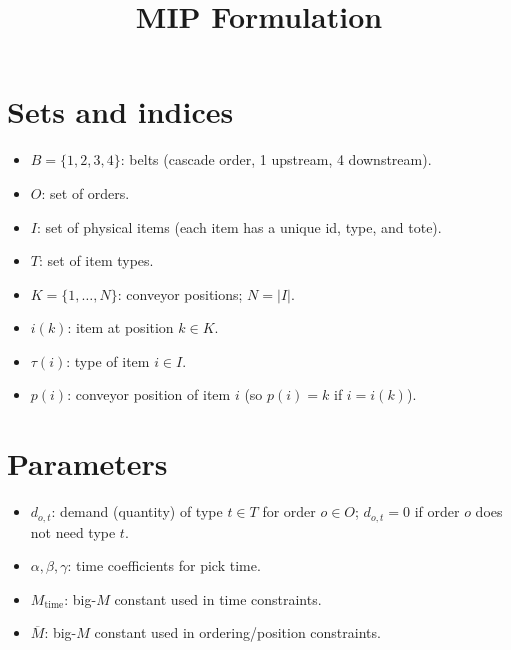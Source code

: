 \documentclass[11pt]{article}
\title{MIP Formulation}
\author{}
\date{}
\begin{document}
\maketitle

\section{Sets and indices}
\begin{itemize}
  \item $B = \{1,2,3,4\}$: belts (cascade order, 1 upstream, 4 downstream).
  \item $O$: set of orders.
  \item $I$: set of physical items (each item has a unique id, type, and tote).
  \item $T$: set of item types.
  \item $K = \{1,\ldots,N\}$: conveyor positions; $N = |I|$.
  \item $i(k)$: item at position $k \in K$.
  \item $\tau(i)$: type of item $i \in I$.
  \item $p(i)$: conveyor position of item $i$ (so $p(i) = k$ if $i = i(k)$).
\end{itemize}

\section{Parameters}
\begin{itemize}
  \item $d_{o,t}$: demand (quantity) of type $t \in T$ for order $o \in O$; $d_{o,t}=0$ if order $o$ does not need type $t$.
  \item $\alpha, \beta, \gamma$: time coefficients for pick time.
  \item $M_{\text{time}}$: big-$M$ constant used in time constraints.
  \item $\overline{M}$: big-$M$ constant used in ordering/position constraints.
\end{itemize}
\end{document}
